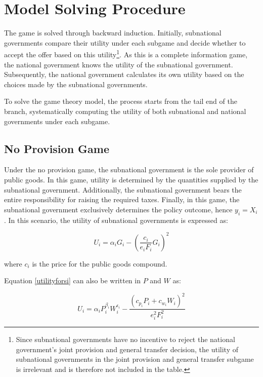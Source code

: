 \section{Model Solving Procedure}

The game is solved through backward induction. Initially, subnational governments compare their utility under each subgame and decide whether to accept the offer based on this utility\footnote{Since subnational governments have no incentive to reject the national government's joint provision and general transfer decision, the utility of subnational governments in the joint provision and general transfer subgame is irrelevant and is therefore not included in the table.}. As this is a complete information game, the national government knows the utility of the subnational government. Subsequently, the national government calculates its own utility based on the choices made by the subnational governments.

To solve the game theory model, the process starts from the tail end of the branch, systematically computing the utility of both subnational and national governments under each subgame.%

\subsection{No Provision Game}

Under the no provision game, the subnational government is the sole provider of public goods. In this game, utility is determined by the quantities supplied by the subnational government. Additionally, the subnational government bears the entire responsibility for raising the required taxes. Finally, in this game, the subnational government exclusively determines the policy outcome, hence $y_i=X_i$. In this scenario, the utility of subnational governments is expressed as:

\begin{equation}
    U_i=\alpha_i G_i-\left(\frac{c_i}{e_i F_i} G_i\right)^2 \label{utilityforsi}
\end{equation}

where $c_i$ is the price for the public goods compound.

Equation \ref{utilityforsi} can also be written in $P$ and $W$ as:

\begin{equation}
    U_i=\alpha_i P_i^{\beta_i}W_i^{\epsilon_i}-\frac{(c_{p_i}P_i+c_{w_i}W_i)^2}{e_i^2 F_i^2}
\end{equation}



